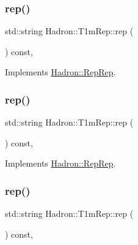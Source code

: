 \subsubsection{\texorpdfstring{rep()}{rep()}\hspace{0.1cm}{\footnotesize\ttfamily [1/3]}}
{\footnotesize\ttfamily std\+::string Hadron\+::\+T1m\+Rep\+::rep (\begin{DoxyParamCaption}{ }\end{DoxyParamCaption}) const\hspace{0.3cm}{\ttfamily [inline]}, {\ttfamily [virtual]}}



Implements \mbox{\hyperlink{structHadron_1_1RepRep_ab3213025f6de249f7095892109575fde}{Hadron\+::\+Rep\+Rep}}.

\mbox{\label{structHadron_1_1T1mRep_ae8b584d4fdf7f81112d718a300fdbf5b}} 
\subsubsection{\texorpdfstring{rep()}{rep()}\hspace{0.1cm}{\footnotesize\ttfamily [2/3]}}
{\footnotesize\ttfamily std\+::string Hadron\+::\+T1m\+Rep\+::rep (\begin{DoxyParamCaption}{ }\end{DoxyParamCaption}) const\hspace{0.3cm}{\ttfamily [inline]}, {\ttfamily [virtual]}}



Implements \mbox{\hyperlink{structHadron_1_1RepRep_ab3213025f6de249f7095892109575fde}{Hadron\+::\+Rep\+Rep}}.

\mbox{\label{structHadron_1_1T1mRep_ae8b584d4fdf7f81112d718a300fdbf5b}} 
\subsubsection{\texorpdfstring{rep()}{rep()}\hspace{0.1cm}{\footnotesize\ttfamily [3/3]}}
{\footnotesize\ttfamily std\+::string Hadron\+::\+T1m\+Rep\+::rep (\begin{DoxyParamCaption}{ }\end{DoxyParamCaption}) const\hspace{0.3cm}{\ttfamily [inline]}, {\ttfamily [virtual]}}



